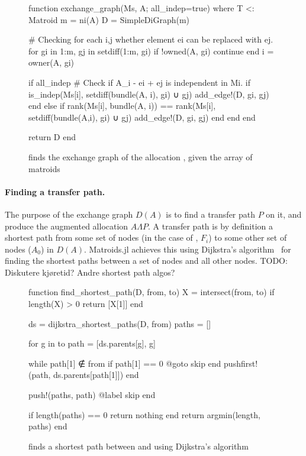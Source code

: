 \begin{figure}
\begin{jllisting}
  
function exchange_graph(Ms, A; all_indep=true) where T <: Matroid
  m = ni(A)
  D = SimpleDiGraph(m)
  
  # Checking for each i,j whether element ei can be replaced with ej.
  for gi in 1:m, gj in setdiff(1:m, gi)
    if !owned(A, gi) continue end
    i = owner(A, gi)

    if all_indep
      # Check if A_i - ei + ej is independent in Mi.
      if is_indep(Ms[i], setdiff(bundle(A, i), gi) ∪ gj)
        add_edge!(D, gi, gj)
      end
    else
      if rank(Ms[i], bundle(A, i)) == rank(Ms[i], setdiff(bundle(A,i), gi) ∪ gj)
        add_edge!(D, gi, gj)
      end
    end
  end

  return D
end

\end{jllisting}
\caption{ finds the exchange graph of the allocation , given the array of matroids }
\label{code:exchange_graph}
\end{figure}

\paragraph{Finding a transfer path.} The purpose of the exchange graph $D(A)$ is to find a transfer path $P$ on it, and produce the augmented allocation $A\Lambda P$. A transfer path is by definition a shortest path from some set of nodes (in the case of , $F_i$) to some other set of nodes ($A_0$) in $D(A)$. Matroids.jl achieves this using Dijkstra's algorithm~\cite{Dijkstra1959} for finding the shortest paths between a set of nodes and all other nodes. TODO: Diskutere kjøretid? Andre shortest path algos? \skelline

\begin{figure}
\begin{jllisting}

function find_shortest_path(D, from, to)
  X = intersect(from, to)
  if length(X) > 0
    return [X[1]]
  end

  ds = dijkstra_shortest_paths(D, from)
  paths = []

  for g in to
    path = [ds.parents[g], g]
    
    while path[1] ∉ from
      if path[1] == 0 @goto skip end
      pushfirst!(path, ds.parents[path[1]])
    end

    push!(paths, path)
    @label skip
  end

  if length(paths) == 0 return nothing end
  return argmin(length, paths)
end

\end{jllisting}
\caption{ finds a shortest path between  and  using Dijkstra's algorithm}
\label{code:find_shortest_path}
\end{figure}

